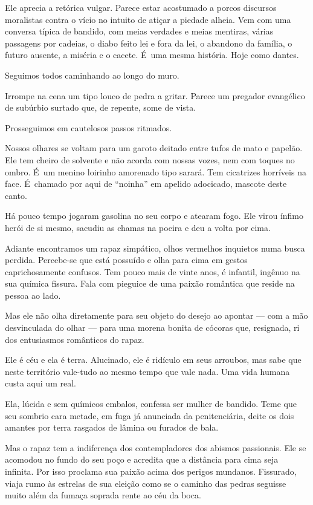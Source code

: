 Ele aprecia a retórica vulgar. Parece estar acostumado a porcos
discursos moralistas contra o vício no intuito de atiçar a piedade
alheia. Vem com uma conversa típica de bandido, com meias verdades e
meias mentiras, várias passagens por cadeias, o diabo feito lei e fora
da lei, o abandono da família, o futuro ausente, a miséria e o cacete. É~uma mesma história. Hoje como dantes.

\asterisc{}

Seguimos todos caminhando ao longo do muro.

Irrompe na cena um tipo louco de pedra a gritar. Parece um pregador
evangélico de subúrbio surtado que, de repente, some de vista.

Prosseguimos em cautelosos passos ritmados.

\asterisc{}

Nossos olhares se voltam para um garoto deitado entre tufos de mato e
papelão. Ele tem cheiro de solvente e não acorda com nossas vozes, nem
com toques no ombro. É~um menino loirinho amorenado tipo sarará. Tem
cicatrizes horríveis na face. É~chamado por aqui de ``noinha'' em
apelido adocicado, mascote deste canto.

Há pouco tempo jogaram gasolina no seu corpo e atearam fogo. Ele virou
ínfimo herói de si mesmo, sacudiu as chamas na poeira e deu a volta por
cima.

Adiante encontramos um rapaz simpático, olhos vermelhos inquietos numa
busca perdida. Percebe-se que está possuído e olha para cima em gestos
caprichosamente confusos. Tem pouco mais de vinte anos, é infantil,
ingênuo na sua química fissura. Fala com pieguice de uma paixão
romântica que reside na pessoa ao lado.

Mas ele não olha diretamente para seu objeto do desejo ao apontar ---
com a mão desvinculada do olhar --- para uma morena bonita de cócoras
que, resignada, ri dos entusiasmos românticos do rapaz.

Ele é céu e ela é terra. Alucinado, ele é ridículo em seus arroubos, mas
sabe que neste território vale-tudo ao mesmo tempo que vale nada. Uma
vida humana custa aqui um real.

Ela, lúcida e sem químicos embalos, confessa ser mulher de bandido. Teme
que seu sombrio cara metade, em fuga já anunciada da penitenciária,
deite os dois amantes por terra rasgados de lâmina ou furados de bala.

Mas o rapaz tem a indiferença dos contempladores dos abismos passionais.
Ele se acomodou no fundo do seu poço e acredita que a distância para
cima seja infinita. Por isso proclama sua paixão acima dos perigos
mundanos. Fissurado, viaja rumo às estrelas de sua eleição como se o
caminho das pedras seguisse muito além da fumaça soprada rente ao céu da
boca.

